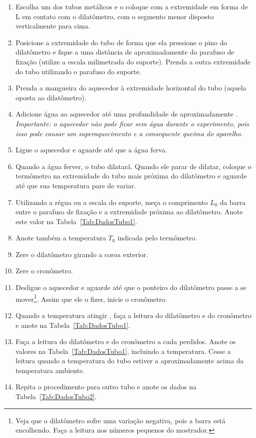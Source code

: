 \begin{enumerate}
\item Escolha um dos tubos metálicos e o coloque com a extremidade em forma de L em contato com o dilatômetro, com o segmento menor disposto verticalmente para cima.
\item Posicione a extremidade do tubo de forma que ela pressione o pino do dilatômetro e fique a uma distância de aproximadamente  do parafuso de fixação (utilize a escala milimetrada do suporte). Prenda a outra extremidade do tubo utilizando o parafuso do suporte.
\item Prenda a mangueira do aquecedor à extremidade horizontal do tubo (aquela oposta ao dilatômetro).
\item Adicione água ao aquecedor até uma profundidade de aproximadamente . \emph{Importante: o aquecedor não pode ficar sem água durante o experimento, pois isso pode causar um superaquecimento e a consequente queima do aparelho.}
\item Ligue o aquecedor e aguarde  até que a água ferva.
\item Quando a água ferver, o tubo dilatará. Quando ele parar de dilatar, coloque o termômetro na extremidade do tubo mais próxima do dilatômetro e aguarde até que sua temperatura pare de variar.
\item Utilizando a régua ou a escala do suporte, meça o comprimento $L_0$ da barra entre o parafuso de fixação e a extremidade próxima ao dilatômetro. Anote este valor na Tabela~\ref{Tab:DadosTubo1}.
\item Anote também a temperatura $T_0$ indicada pelo termômetro.
\item Zere o dilatômetro girando a coroa exterior.
\item Zere o cronômetro.
\item Desligue o aquecedor e aguarde até que o ponteiro do dilatômetro passe a se mover\footnote{Veja que o dilatômetro sofre uma variação negativa, pois a barra está encolhendo. Faça a leitura nos números pequenos do mostrador.}. Assim que ele o fizer, inicie o cronômetro.
\item Quando a temperatura atingir , faça a leitura do dilatômetro e do cronômetro e anote na Tabela~\ref{Tab:DadosTubo1}.
\item Faça a leitura do dilatômetro e do cronômetro a cada  perdidos. Anote os valores na Tabela~\ref{Tab:DadosTubo1}, incluindo a temperatura. Cesse a leitura quando a temperatura do tubo estiver a aproximadamente  acima da temperatura ambiente.
\item Repita o procedimento para outro tubo e anote os dados na Tabela~\ref{Tab:DadosTubo2}.
\end{enumerate}

